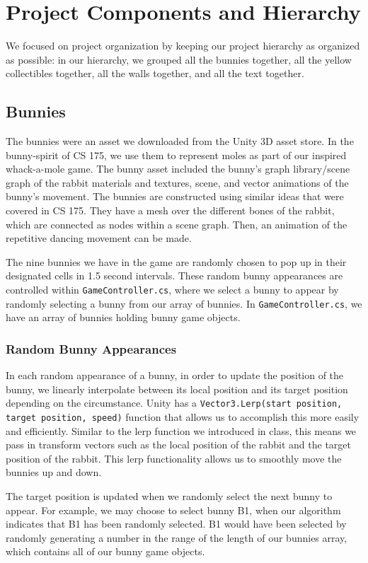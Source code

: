 \documentclass[12pt]{article}
\begin{document}
\section{Project Components and Hierarchy}
  We focused on project organization by keeping our project hierarchy as organized as possible: in our hierarchy, we grouped all the bunnies together, all the yellow collectibles together, all the walls together, and all the text together.

\subsection{Bunnies}
  The bunnies were an asset we downloaded from the Unity 3D asset store. In the bunny-spirit of CS 175, we use them to represent moles as part of our inspired whack-a-mole game. The bunny asset included the bunny's graph library/scene graph of the rabbit materials and textures, scene, and  vector animations of the bunny's movement. The bunnies are constructed using similar ideas that were covered in CS 175. They have a mesh over the different bones of the rabbit, which are connected as nodes within a scene graph. Then, an animation of the repetitive dancing movement can be made. 

  The nine bunnies we have in the game are randomly chosen to pop up in their designated cells in 1.5 second intervals. These random bunny appearances are controlled within \verb+GameController.cs+, where we select a bunny to appear by randomly selecting a bunny from our array of bunnies. In \verb+GameController.cs+, we have an array of bunnies holding bunny game objects.

\subsubsection{Random Bunny Appearances}
  In each random appearance of a bunny, in order to update the position of the bunny, we linearly interpolate between its local position and its target position depending on the circumstance. Unity has a \verb+Vector3.Lerp(start position, target position, speed)+ function that allows us to accomplish this more easily and efficiently. Similar to the lerp function we introduced in class, this means we pass in transform vectors such as the local position of the rabbit and the target position of the rabbit. This lerp functionality allows us to smoothly move the bunnies up and down. 

  The target position is updated when we randomly select the next bunny to appear. For example, we may choose to select bunny B1, when our algorithm indicates that B1 has been randomly selected. B1 would have been selected by randomly generating a number in the range of the length of our bunnies array, which contains all of our bunny game objects. 
\end{document}
